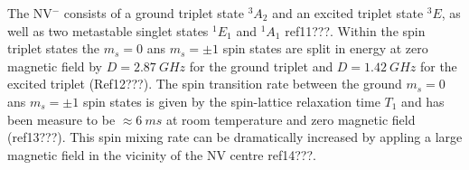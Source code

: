 \documentclass[preprint,prl,twocolumn]{revtex4}
\begin{document}
The NV$^-$ consists of a ground triplet state $^3A_2$ and an excited triplet state $^3E$, as well as two metastable singlet states $^1E_1$ and $^1A_1$ ref11???. Within the spin triplet states the $m_s = 0$ ans $m_s = \pm1$ spin states are split in energy at zero magnetic field by $D=\SI{2.87}{GHz}$ for the ground triplet and $D=\SI{1.42}{GHz}$ for the excited triplet (Ref12???). The spin transition rate between the ground $m_s = 0$ ans $m_s = \pm1$ spin states is given by the spin-lattice relaxation time $T_1$ and has been measure to be $\approx\SI{6}{ms}$ at room temperature and zero magnetic field (ref13???). This spin mixing rate can be dramatically increased by appling a large magnetic field in the vicinity of the NV centre ref14???.

 
\end{document}
